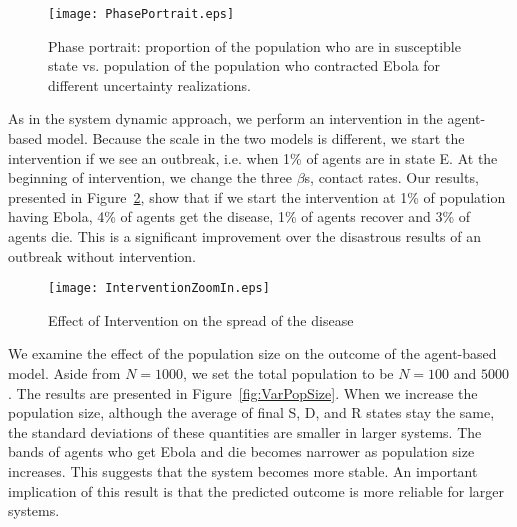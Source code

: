 \begin{figure}[h!]
\begin{center}
\texttt{[image: PhasePortrait.eps]}
\end{center}
\caption{Phase portrait: proportion of the population who are in susceptible state vs. population of the population who contracted Ebola for different uncertainty realizations.}
\label{fig:PhasePortraitABM}
\end{figure}


As in the system dynamic approach, we perform an intervention in the agent-based model. Because the scale in the two models is different, we start the intervention if we see an outbreak, i.e. when 1\% of agents are in state E. At the beginning of intervention, we change the three $\beta$s, contact rates. Our results, presented in Figure~\ref{fig:Intervention}, show that if we start the intervention at 1\% of population having Ebola, 4\% of agents get the disease, 1\% of agents recover and 3\% of agents die. This is a significant improvement over the disastrous results of an outbreak without intervention. 


\begin{figure}[h!]
\begin{center}
\texttt{[image: InterventionZoomIn.eps]}
\end{center}
\caption{Effect of Intervention on the spread of the disease }
\label{fig:Intervention}
\end{figure}


We examine the effect of the population size on the outcome of the agent-based model. Aside from $N = 1000$, we set the total population to be $N = 100$ and $5000$. The results are presented in Figure~\ref{fig:VarPopSize}. When we increase the population size, although the average of final S, D, and R states stay the same, the standard deviations of these quantities are smaller in larger systems. The bands of agents who get Ebola and die becomes narrower as population size increases. This suggests that the system becomes more stable. An important implication of this result is that the predicted outcome is more reliable for larger systems.














